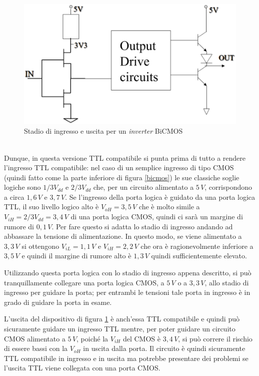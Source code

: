 \documentclass[12pt, a4paper]{report}
\begin{document}
\begin{figure}[h]
    \centering
    \includegraphics[scale=0.4,angle=0]{bicmos3.png}
    \caption{Stadio di ingresso e uscita per un \textit{inverter} BiCMOS}
    \label{odc}
\end{figure}
\\Dunque, in questa versione TTL compatibile si punta prima di tutto a rendere l'ingresso TTL compatibile: nel caso di un semplice ingresso di tipo CMOS (quindi fatto come la parte inferiore di figura \ref{bicmos}) le sue classiche soglie logiche sono $1/3V_{dd}$ e $2/3V_{dd}$ che, per un circuito alimentato a $5\,V$, corrispondono a circa $1,6\,V$ e $3,7\,V$. Se l'ingresso della porta logica è guidato da una porta logica TTL, il suo livello logico alto è $V_{oH} = 3,5\,V$ che è molto simile a $V_{iH} = 2/3V_{dd} = 3,4\,V$ di una porta logica CMOS, quindi ci sarà un margine di rumore di $0,1\,V$. Per fare questo si adatta lo stadio di ingresso andando ad abbassare la tensione di alimentazione. In questo modo, se viene alimentato a $3,3\,V$ si ottengono $V_{iL} = 1,1\,V$ e $V_{iH} = 2,2\,V$ che ora è ragionevolmente inferiore a $3,5\,V$ e quindi il margine di rumore alto è $1,3\,V$ quindi sufficientemente elevato.

Utilizzando questa porta logica con lo stadio di ingresso appena descritto, si può tranquillamente collegare una porta logica CMOS, a $5\,V$ o a $3,3\,V$, allo stadio di ingresso per guidare la porta; per entrambi le tensioni tale porta in ingresso è in grado di guidare la porta in esame.

L'uscita del dispositivo di figura \ref{odc} è anch'essa TTL compatibile e quindi può sicuramente guidare un ingresso TTL mentre, per poter guidare un circuito CMOS alimentato a $5\,V$, poiché la $V_{iH}$ del CMOS è $3,4\,V$, si può correre il rischio di essere bassi con la $V_{oH}$ in uscita dalla porta. Il circuito è quindi sicuramente TTL compatibile in ingresso e in uscita ma potrebbe presentare dei problemi se l'uscita TTL viene collegata con una porta CMOS.
\end{document}
